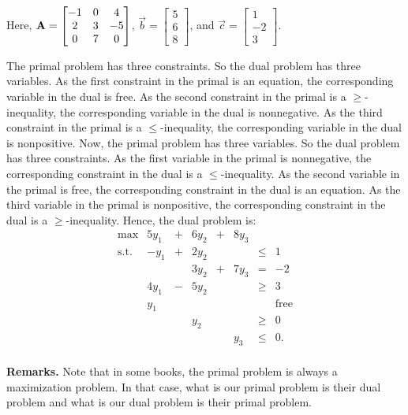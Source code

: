 Here,
\(\mathbf{A}= \begin{bmatrix}  -1 & 0 & 4 \\  2 & 3 & -5 \\  0 & 7 & 0 \end{bmatrix}\),
\(\vec{b} = \begin{bmatrix}5 \\6\\8\end{bmatrix}\), and
\(\vec{c} = \begin{bmatrix}1 \\-2\\3\end{bmatrix}\).

The primal problem has three constraints. So the dual problem has three
variables. As the first constraint in the primal is an equation, the
corresponding variable in the dual is free. As the second constraint in
the primal is a \(\geq\)-inequality, the corresponding variable in the
dual is nonnegative. As the third constraint in the primal is a
\(\leq\)-inequality, the corresponding variable in the dual is
nonpositive. Now, the primal problem has three variables. So the dual
problem has three constraints. As the first variable in the primal is
nonnegative, the corresponding constraint in the dual is a
\(\leq\)-inequality. As the second variable in the primal is free, the
corresponding constraint in the dual is an equation. As the third
variable in the primal is nonpositive, the corresponding constraint in
the dual is a \(\geq\)-inequality. Hence, the dual problem is:
\[\begin{array}{rrcrcrcl}
\mbox{max} & 5y_1 & + & 6y_2 & + & 8y_3 & \\
\mbox{s.t.} & -y_1 & + & 2y_2 &   &      & \leq &  1 \\
            &      &   & 3y_2 & + & 7y_3 & = & -2 \\
            & 4y_1 & - & 5y_2 &   &      & \geq &  3 \\
            &  y_1 &   &      &   &      &      &  \mbox{free} \\ 
            &     &    & y_2  &   &      & \geq & 0 \\
            &     &    &      &   & y_3  & \leq & 0.\\
\end{array}\]

\textbf{Remarks.} Note that in some books, the primal problem is always
a maximization problem. In that case, what is our primal problem is
their dual problem and what is our dual problem is their primal problem.

